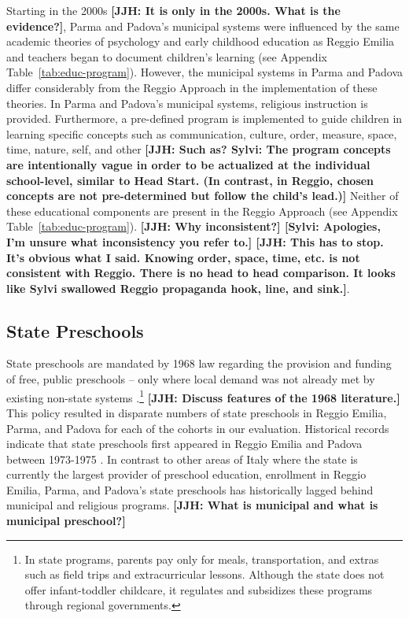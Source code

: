 Starting in the 2000s \textbf{[JJH: It is only in the 2000s. What is the evidence?]}, Parma and Padova's municipal systems were influenced by the same academic theories of psychology and early childhood education as Reggio Emilia and teachers began to document children's learning (see Appendix Table~\ref{tab:educ-program}). However, the municipal systems in Parma and Padova differ considerably from the Reggio Approach in the implementation of these theories. In Parma and Padova's municipal systems, religious instruction is provided. Furthermore, a pre-defined program is implemented to guide children in learning specific concepts such as communication, culture, order, measure, space, time, nature, self, and other \textbf{[JJH: Such as? Sylvi: The program concepts are intentionally vague in order to be actualized at the individual school-level, similar to Head Start. (In contrast, in Reggio, chosen concepts are not pre-determined but follow the child's lead.)]} Neither of these educational components are present in the Reggio Approach (see Appendix Table~\ref{tab:educ-program}).  \textbf{[JJH: Why inconsistent?] [Sylvi: Apologies, I'm unsure what inconsistency you refer to.] [JJH: This has to stop. It's obvious what I said. Knowing order, space, time, etc. is not consistent with Reggio. There is no head to head comparison. It looks like Sylvi swallowed Reggio propaganda hook, line, and sink.]}.

\subsection{State Preschools}

State preschools are mandated by 1968 law regarding the provision and funding of free, public preschools -- only where local demand was not already met by existing non-state systems \citep{Hohnerlein_2009_Paradox-Public-Preschools}.\footnote{In state programs, parents pay only for meals, transportation, and extras such as field trips and extracurricular lessons. Although the state does not offer infant-toddler childcare, it regulates and subsidizes these programs through regional governments.} \textbf{[JJH: Discuss features of the 1968 literature.]} This policy resulted in disparate numbers of state preschools in Reggio Emilia, Parma, and Padova for each of the cohorts in our evaluation. Historical records indicate that state preschools first appeared in Reggio Emilia and Padova between 1973-1975 \citep{Padova-Admin-Data_1964-2011,Reggio-Admin-data_1966-2006,Reggio-Annual-Journals_1994-2011}. In contrast to other areas of Italy where the state is currently the largest provider of preschool education, enrollment in Reggio Emilia, Parma, and Padova's state preschools has historically lagged behind municipal and religious programs. \textbf{[JJH: What is municipal and what is municipal preschool?]}

